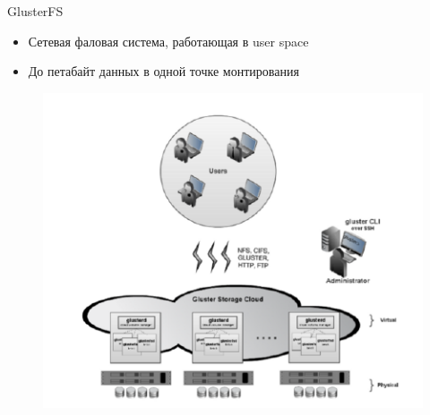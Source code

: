 \documentclass{beamer}
\begin{document}
\begin{frame}{GlusterFS}
	\begin{itemize}
		\item Сетевая фаловая система, работающая в user space
		\item До петабайт данных в одной точке монтирования
	\end{itemize}
	\begin{figure}[h]
		\centering
		\includegraphics[width=0.7\linewidth]{scheme.png}
	\end{figure}
\end{frame}
\end{document}

